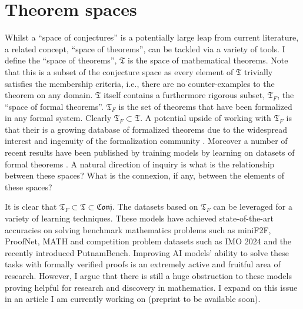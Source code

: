 \section{Theorem spaces}
Whilst a ``space of conjectures'' is a potentially large leap from current literature, a related concept, ``space of theorems'', can be tackled via a variety of tools.
I define the ``space of theorems'', $\mathfrak{T}$ is the space of mathematical theorems. Note that this is a subset of the conjecture space as every element of $\mathfrak{T}$ trivially satisfies the membership criteria, i.e.,
there are no counter-examples to the theorem on any domain.
$\mathfrak{T}$ itself contains a furthermore rigorous subset, $\mathfrak{T}_F$, the ``space of formal theorems''. $\mathfrak{T}_F$ is the set of theorems that have been formalized in any formal system. Clearly $\mathfrak{T}_F\subset\mathfrak{T}$. A potential upside of working with $\mathfrak{T}_F$ is that their is a growing database of formalized theorems due to the widespread interest and ingenuity of the formalization community \cite{formalization_examples}.
Moreover a number of recent results have been published by training models by learning on datasets of formal theorems \cite{Deepmind_stuff}. A natural direction of inquiry is what is the relationship between these spaces? What is the connexion, if any, between the elements of these spaces?
\\\par
It is clear that $\mathfrak{T}_F\subset\mathfrak{T}\subset\mathfrak{Conj}$. The datasets based on $\mathfrak{T}_F$ can be leveraged for a variety of learning techniques. These models have achieved state-of-the-art accuracies on solving benchmark mathematics problems such as miniF2F, ProofNet, MATH and competition problem datasets such as IMO 2024 and the recently introduced PutnamBench. Improving AI models' ability to solve these tasks with formally verified proofs
is an extremely active and fruitful area of research. However, I argue that there is still a huge obstruction to these models proving helpful for research and discovery in mathematics. I expand on this issue in an article I am currently working on (preprint to be available soon). 

